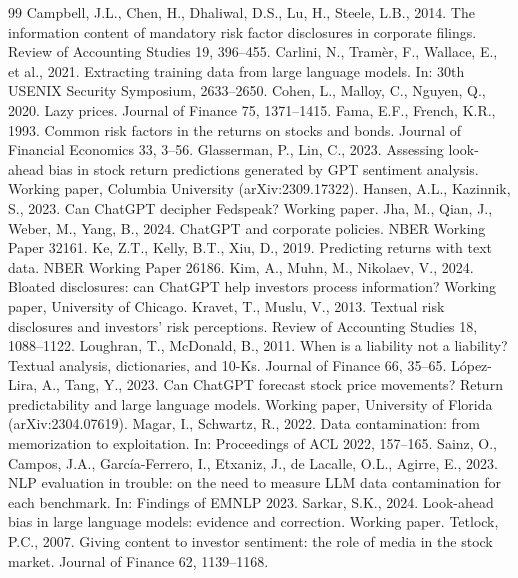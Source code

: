 \documentclass[12pt]{article}
\begin{document}
\begin{thebibliography}{99}
 Campbell, J.L., Chen, H., Dhaliwal, D.S.,
Lu, H., Steele, L.B., 2014. The information content of mandatory risk factor disclosures in
corporate filings. Review of Accounting Studies 19, 396--455.
 Carlini, N., Tramèr, F., Wallace, E., et al.,
2021. Extracting training data from large language models. In: 30th USENIX Security
Symposium, 2633--2650.
 Cohen, L., Malloy, C., Nguyen, Q., 2020.
Lazy prices. Journal of Finance 75, 1371--1415.
 Fama, E.F., French, K.R., 1993. Common risk factors
in the returns on stocks and bonds. Journal of Financial Economics 33, 3--56.
 Glasserman, P., Lin, C., 2023.
Assessing look-ahead bias in stock return predictions generated by GPT sentiment analysis.
Working paper, Columbia University (arXiv:2309.17322).
 Hansen, A.L., Kazinnik, S., 2023.
Can ChatGPT decipher Fedspeak? Working paper.
 Jha, M., Qian, J., Weber, M., Yang, B., 2024.
ChatGPT and corporate policies. NBER Working Paper 32161.
 Ke, Z.T., Kelly, B.T., Xiu, D., 2019. Predicting returns
with text data. NBER Working Paper 26186.
 Kim, A., Muhn, M., Nikolaev, V., 2024. Bloated
disclosures: can ChatGPT help investors process information? Working paper, University of
Chicago.
 Kravet, T., Muslu, V., 2013. Textual risk
disclosures and investors' risk perceptions. Review of Accounting Studies 18, 1088--1122.
 Loughran, T., McDonald, B., 2011.
When is a liability not a liability? Textual analysis, dictionaries, and 10-Ks. Journal of
Finance 66, 35--65.
 López-Lira, A., Tang, Y., 2023.
Can ChatGPT forecast stock price movements? Return predictability and large language models.
Working paper, University of Florida (arXiv:2304.07619).
 Magar, I., Schwartz, R., 2022. Data
contamination: from memorization to exploitation. In: Proceedings of ACL 2022, 157--165.
 Sainz, O., Campos, J.A., García-Ferrero, I.,
Etxaniz, J., de Lacalle, O.L., Agirre, E., 2023. NLP evaluation in trouble: on the need to
measure LLM data contamination for each benchmark. In: Findings of EMNLP 2023.
 Sarkar, S.K., 2024. Look-ahead bias in large language
models: evidence and correction. Working paper.
 Tetlock, P.C., 2007. Giving content to investor
sentiment: the role of media in the stock market. Journal of Finance 62, 1139--1168.
\end{thebibliography}
\end{document}
